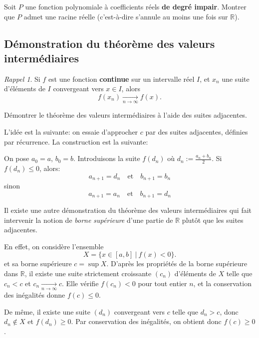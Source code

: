 \documentclass[12pt]{article}
\newcommand{\RR}{\mathbb R}
\theoremstyle{definition}
\theoremstyle{theorem}
\theoremstyle{remark}
\newtheorem*{rapl}{Rappel}
\begin{document}
\begin{exer}
	Soit $P$ une fonction polynomiale à coefficients réels \textbf{de degré impair}. Montrer que $P$ admet une racine réelle (c'est-à-dire s'annule au moins une fois sur $\RR$).
\end{exer}

\subsection*{Démonstration du théorème des valeurs intermédiaires}

\begin{rapl}
Si $f$ est une fonction \textbf{continue} sur un intervalle réel $I$, et $x_n$ une suite d'éléments de $I$ convergeant vers $x\in I$, alors
\[
f(x_n)\xrightarrow[n\to\infty]{} f(x).
\]
\end{rapl}

\begin{exer}
Démontrer le théorème des valeurs intermédiaires à l'aide des suites adjacentes.

L'idée est la suivante: on essaie d'approcher $c$ par des suites adjacentes, définies par récurrence. La construction est la suivante:

On pose $a_0 = a$, $b_0 = b$. Introduisons la suite $f(d_n)$ où $d_n:=\frac{a_n+b_n}{2}$. Si $f(d_n)\leq 0$, alors:
\begin{equation*}
a_{n+1} = d_n\quad\text{et}\quad
b_{n+1} = b_n
\end{equation*}
sinon
\begin{equation*}
a_{n+1} = a_n \quad\text{et}\quad
b_{n+1} = d_n
\end{equation*}
\end{exer}

Il existe une autre démonstration du théorème des valeurs intermédiaires qui fait intervenir la notion de \textit{borne supérieure} d'une partie de $\RR$ plutôt que les suites adjacentes.

En effet, on considère l'ensemble
\[
X = \{x\in[a,b] \ |\ f(x) < 0  \}.
\]
et sa borne supérieure $c = \sup X$. D'après les propriétés de la borne supérieure dans $\RR$, il existe une suite strictement croissante $(c_n)$ d'éléments de $X$ telle que $c_n < c$ et $c_n\xrightarrow[n\to\infty]{} c$. Elle vérifie $f(c_n) < 0$ pour tout entier $n$, et la conservation des inégalités donne $f(c) \leq 0$.

De même, il existe une suite $(d_n)$ convergeant vers $c$ telle que $d_n > c$, donc $d_n \not\in X$ et $f(d_n) \geq 0$. Par conservation des inégalités, on obtient donc $f(c) \geq 0$.
\end{document}
